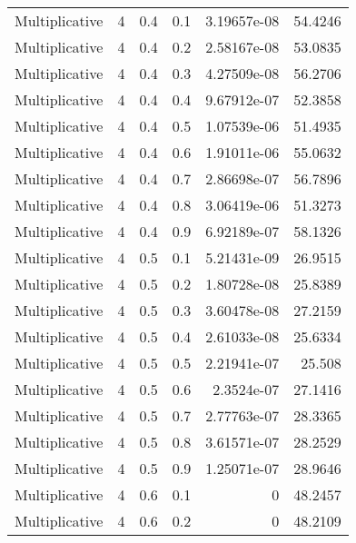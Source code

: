 \documentclass{article}
\begin{document}
\begin{longtable}[H]{lrrrrr}
 Multiplicative &       4 &   0.4 &            0.1 &      3.19657e-08 &         54.4246 \\
 Multiplicative &       4 &   0.4 &            0.2 &      2.58167e-08 &         53.0835 \\
 Multiplicative &       4 &   0.4 &            0.3 &      4.27509e-08 &         56.2706 \\
 Multiplicative &       4 &   0.4 &            0.4 &      9.67912e-07 &         52.3858 \\
 Multiplicative &       4 &   0.4 &            0.5 &      1.07539e-06 &         51.4935 \\
 Multiplicative &       4 &   0.4 &            0.6 &      1.91011e-06 &         55.0632 \\
 Multiplicative &       4 &   0.4 &            0.7 &      2.86698e-07 &         56.7896 \\
 Multiplicative &       4 &   0.4 &            0.8 &      3.06419e-06 &         51.3273 \\
 Multiplicative &       4 &   0.4 &            0.9 &      6.92189e-07 &         58.1326 \\
 Multiplicative &       4 &   0.5 &            0.1 &      5.21431e-09 &         26.9515 \\
 Multiplicative &       4 &   0.5 &            0.2 &      1.80728e-08 &         25.8389 \\
 Multiplicative &       4 &   0.5 &            0.3 &      3.60478e-08 &         27.2159 \\
 Multiplicative &       4 &   0.5 &            0.4 &      2.61033e-08 &         25.6334 \\
 Multiplicative &       4 &   0.5 &            0.5 &      2.21941e-07 &         25.508  \\
 Multiplicative &       4 &   0.5 &            0.6 &      2.3524e-07  &         27.1416 \\
 Multiplicative &       4 &   0.5 &            0.7 &      2.77763e-07 &         28.3365 \\
 Multiplicative &       4 &   0.5 &            0.8 &      3.61571e-07 &         28.2529 \\
 Multiplicative &       4 &   0.5 &            0.9 &      1.25071e-07 &         28.9646 \\
 Multiplicative &       4 &   0.6 &            0.1 &      0           &         48.2457 \\
 Multiplicative &       4 &   0.6 &            0.2 &      0           &         48.2109 \\

\end{longtable}
\end{document}
